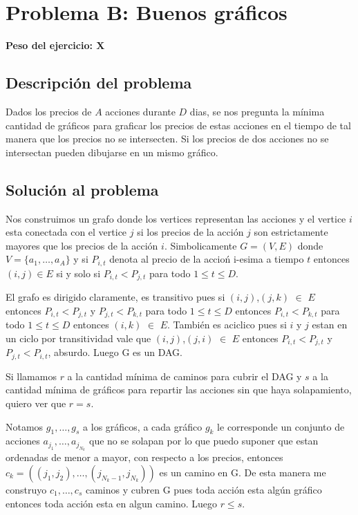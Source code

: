 \newpage{}
\section{Problema B: Buenos gráficos}
\textbf{Peso del ejercicio: X}
\subsection{Descripción del problema}
	Dados los precios de $A$ acciones durante $D$ dias, se nos 
	pregunta la mínima cantidad de gráficos para graficar los 
	precios de estas acciones en el tiempo de tal manera que 
	los precios no se intersecten. Si los precios de dos acciones
	no se intersectan pueden dibujarse en un mismo gráfico.
	
	
\subsection{Solución al problema}
	Nos construimos un grafo donde los vertices representan 
	las acciones y el vertice $i$ esta conectada con el vertice $j$ si
	los precios de la acci\'on $j$ son estrictamente mayores que los precios de la 
	acci\'on $i$. Simbolicamente $G=(V,E)$ donde $V=\{a_1,\dots ,a_A\}$ y si
	$P_{i,t}$ denota al precio de la accio\'n i-esima a tiempo $t$ entonces
	$(i,j) \in E$ si y solo si $P_{i,t}<P_{j,t}$ para todo $1\leq t\leq D$.
	
	
	
	El grafo es dirigido claramente, es transitivo pues si $(i,j)$,$(j,k)$ $\in$ $E$
	entonces $P_{i,t}<P_{j,t}$ y $P_{j,t}<P_{k,t}$ para todo $1\leq t\leq D$ entonces
	$P_{i,t}<P_{k,t}$ para todo $1\leq t\leq D$ entonces $(i,k)$ $\in$ $E$. También
	es aciclico pues si $i$ y $j$ estan en un ciclo por transitividad
	vale que $(i,j)$,$(j,i)$ $\in$ $E$ entonces  $P_{i,t}<P_{j,t}$ y $P_{j,t}<P_{i,t}$, absurdo.
	Luego G es un DAG.
	
	
	Si llamamos $r$ a la cantidad mínima de caminos para cubrir el DAG
	y $s$ a la cantidad mínima de gráficos para repartir las acciones
	sin que haya solapamiento, quiero ver que $r=s$.
	
	Notamos $g_1,\dots ,g_s$ a los gráficos, a cada gráfico $g_k$ le corresponde
	un conjunto de acciones $a_{j_1},\dots ,a_{j_{N_k}}$ que no se solapan
	por lo que puedo suponer que estan ordenadas de menor a mayor, con respecto
	a los precios, entonces
	$c_k=((j_1,j_2),\dots ,(j_{N_k-1},j_{N_k}))$ es un camino en G. De esta manera me construyo
	$c_1,\dots ,c_s$ caminos y cubren G pues toda acción esta algún 
	gráfico entonces toda acción esta en algun camino.
	Luego $r\leq s$.
	
